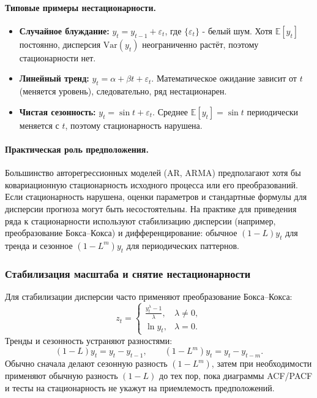 \documentclass[12pt,a4paper]{article}
\begin{document}
\paragraph{Типовые примеры нестационарности.}
\begin{itemize}
  \item \textbf{Случайное блуждание:} $y_t=y_{t-1}+\varepsilon_t$, где $\{\varepsilon_t\}$ - белый шум. Хотя $\mathbb{E}[y_t]$ постоянно, дисперсия $\mathrm{Var}(y_t)$ неограниченно растёт, поэтому стационарности нет.
  \item \textbf{Линейный тренд:} $y_t=\alpha+\beta t+\varepsilon_t$. Математическое ожидание зависит от $t$ (меняется уровень), следовательно, ряд нестационарен.
  \item \textbf{Чистая сезонность:} $y_t=\sin t+\varepsilon_t$. Среднее $\mathbb{E}[y_t]=\sin t$ периодически меняется с $t$, поэтому стационарность нарушена.
\end{itemize}

\paragraph{Практическая роль предположения.}
Большинство авторегрессионных моделей (AR, ARMA) предполагают хотя бы ковариационную стационарность исходного процесса или его преобразований. Если стационарность нарушена, оценки параметров и стандартные формулы для дисперсии прогноза могут быть несостоятельны. На практике для приведения ряда к стационарности используют стабилизацию дисперсии (например, преобразование Бокса–Кокса) и дифференцирование: обычное $(1-L)y_t$ для тренда и сезонное $(1-L^m)y_t$ для периодических паттернов.

\subsubsection{Стабилизация масштаба и снятие нестационарности}
Для стабилизации дисперсии часто применяют преобразование Бокса–Кокса:
\[
z_t=
\begin{cases}
\displaystyle \frac{y_t^{\lambda}-1}{\lambda}, & \lambda\neq 0,\\[4pt]
\ln y_t, & \lambda=0.
\end{cases}
\]
Тренды и сезонность устраняют разностями:
\[
(1-L)y_t=y_t-y_{t-1}, \qquad (1-L^m)y_t=y_t-y_{t-m}.
\]
Обычно сначала делают сезонную разность $(1-L^m)$, затем при необходимости применяют обычную разность $(1-L)$ до тех пор, пока диаграммы ACF/PACF и тесты на стационарность не укажут на приемлемость предположений.
\end{document}
